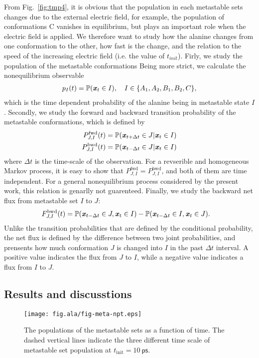 \documentclass[aip,jcp,a4paper,preprint,onecolumn]{revtex4-1}
\newcommand{\vect}[1]{\textbf{\textit{#1}}}
\newcommand{\fwd}[0]{\textrm{fwd}}
\newcommand{\bwd}[0]{\textrm{bwd}}
\begin{document}
From Fig.~\ref{fig:tmp4}, it is obvious that the population in each
metastable sets changes due to the external electric field, for
example, the population of conformations C vanishes in equilibrium,
but plays an important role when the electric field is applied. We
therefore want to study how the alanine changes from one conformation
to the other, how fast is the change, and the relation to the speed of
the increasing electric field (i.e. the value of $t_{init}$). 
Firly, we study the population of the metastable conformations
Being more strict, we calculate the nonequilibrium observable
\begin{align}
  p_I(t) = \mathbb P (\vect x_t \in I), \quad  I \in \{A_1, A_2, B_1, B_2, C\},
\end{align}
which is the time dependent probability of the alanine being in metastable
state $I$.
Secondly, we study the
forward and backward transition probability of the metastable conformations, which is defined by
\begin{align}
  P^{\fwd}_{J,I}(t) & = \mathbb P( \vect x_{t+\Delta t} \in J | \vect x_t \in I) \\
  P^{\bwd}_{J,I}(t) & = \mathbb P( \vect x_{t-\Delta t} \in J | \vect x_t \in I) 
\end{align}
where $\Delta t$ is the time-scale of the observation.
For a revserible and homogeneous Markov process, it is easy to show
that $P^{\fwd}_{J,I} = P^{\bwd}_{J,I}$, and both of them are time independent. For a general nonequilibrium
process considered by the present work, this relation is genarlly not guarenteed. Finally, we study the backward net flux from metastable set $I$ to $J$:
\begin{align}
  F^{\bwd}_{J,I}(t) & = \mathbb P( \vect x_{t-\Delta t} \in J, \vect x_t \in I) - \mathbb P( \vect x_{t-\Delta t} \in I, \vect x_t \in J).
\end{align}
Unlike the transition probabilities that are defined by the conditional
probability, the net flux is defined by the difference between
two joint probabilities, and prensents how much conformation $J$ is changed
into $I$ in the past $\Delta t$ interval. A positive value indicates the
flux from $J$ to $I$, while a negative value indicates a flux from $I$ to $J$.

\subsection{Results and discusstions}
\begin{figure}
  \centering
  \texttt{[image: fig.ala/fig-meta-npt.eps]}
  \caption{The populations of the metastable sets as a function of time.
    The dashed vertical lines indicate the three different time scale of
  metastable set population at $t_{\textrm{init}} = 10~\textsf{ps}$.}
  \label{fig:tmp5}
\end{figure}
\end{document}
